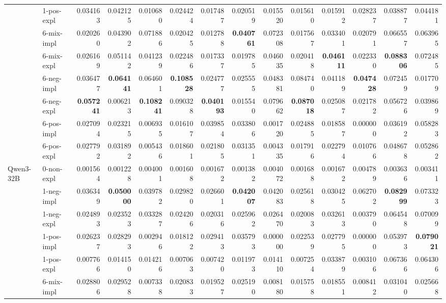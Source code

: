 \begin{tabular}{ll|rrrr|rrrr|rrrr}
 & 1-pos-expl & 0.034163 & 0.042125 & 0.010680 & 0.024424 & 0.017487 & 0.020519 & 0.015520 & 0.015610 & 0.015912 & 0.028237 & 0.038877 & 0.044181 \\
 & 6-mix-impl & 0.020260 & 0.043902 & 0.071886 & 0.020425 & 0.012788 & \bfseries 0.040761 & 0.072308 & 0.017567 & 0.033401 & 0.020791 & 0.066557 & 0.063965 \\
 & 6-mix-expl & 0.026169 & 0.051142 & 0.041239 & 0.022486 & 0.017337 & 0.019785 & 0.046035 & 0.020418 & \bfseries 0.046111 & 0.022330 & \bfseries 0.088306 & 0.072485 \\
 & 6-neg-impl & 0.036477 & \bfseries 0.064141 & 0.064601 & \bfseries 0.108528 & 0.024777 & 0.025555 & 0.048381 & 0.084740 & 0.041189 & \bfseries 0.047428 & 0.072459 & 0.017709 \\
 & 6-neg-expl & \bfseries 0.057241 & 0.006213 & \bfseries 0.108241 & 0.090328 & \bfseries 0.040193 & 0.015540 & 0.079662 & \bfseries 0.087018 & 0.025087 & 0.021782 & 0.056726 & 0.039869 \\
 & 6-pos-impl & 0.027094 & 0.023215 & 0.006935 & 0.016107 & 0.039854 & 0.033806 & 0.001720 & 0.024885 & 0.018587 & 0.000000 & 0.036192 & 0.058283 \\
 & 6-pos-expl & 0.027792 & 0.031892 & 0.005436 & 0.018601 & 0.021805 & 0.031351 & 0.004335 & 0.017916 & 0.022794 & 0.010766 & 0.048678 & 0.052862 \\
 \midrule
\multirow[c]{11}{*}{Qwen3-32B} & 0-non-expl & 0.001564 & 0.001228 & 0.004001 & 0.001608 & 0.001672 & 0.001382 & 0.004072 & 0.001688 & 0.001672 & 0.004789 & 0.003636 & 0.003411 \\
 & 1-neg-impl & 0.036349 & \bfseries 0.050000 & 0.039782 & 0.029820 & 0.026601 & \bfseries 0.042007 & 0.042083 & 0.025618 & 0.030425 & 0.062702 & \bfseries 0.082999 & 0.073323 \\
 & 1-neg-expl & 0.024893 & 0.023523 & 0.033287 & 0.024206 & 0.020316 & 0.025962 & 0.026470 & 0.020083 & 0.032613 & 0.003790 & 0.064548 & 0.070099 \\
 & 1-pos-impl & 0.026237 & 0.028293 & 0.002946 & 0.018122 & 0.029413 & 0.035793 & 0.000000 & 0.022539 & 0.027795 & 0.000000 & 0.053973 & \bfseries 0.079021 \\
 & 1-pos-expl & 0.007766 & 0.014150 & 0.014216 & 0.007063 & 0.007420 & 0.011973 & 0.014110 & 0.007254 & 0.033879 & 0.003106 & 0.067366 & 0.064306 \\
 & 6-mix-impl & 0.028806 & 0.029528 & 0.007338 & 0.020833 & 0.019527 & 0.025190 & 0.008180 & 0.015758 & 0.018551 & 0.008412 & 0.031040 & 0.025668 \\

\end{tabular}
